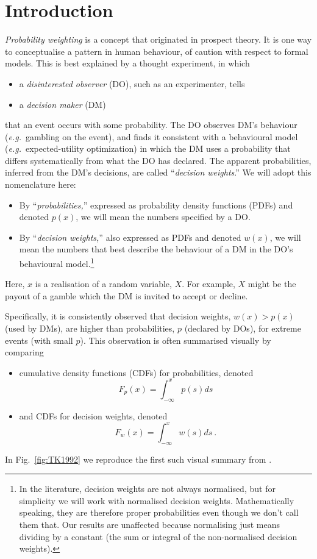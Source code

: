 \documentclass[a4paper, 12pt]{article}
\newcommand{\bi}{\begin{itemize}}
\newcommand{\ei}{\end{itemize}}
\newcommand{\fref}[1]{Fig.~\ref{fig:#1}}
\newcommand{\eg}{{\it e.g.}\ }
\newcommand{\be}{\begin{equation}}
\newcommand{\ee}{\end{equation}}
\begin{document}
\section{Introduction}
{\it Probability weighting} is a concept that originated in prospect theory. It is one way to conceptualise a pattern in human behaviour, of caution with respect to formal models.
This is best explained by a thought experiment, in which  
\bi
	\item a \textit{disinterested observer} (DO), such as an experimenter, tells
	\item a \textit{decision maker} (DM)
\ei
that an event occurs with some probability. The DO observes DM's behaviour (\eg gambling on the event), and finds it consistent with a behavioural model (\eg expected-utility optimization) in which the DM uses a probability that differs systematically from what the DO has declared. The apparent probabilities, inferred from the DM's decisions, are called ``{\it decision weights}.'' We will adopt this nomenclature here: 
% 
\bi
	\item By ``\textit{probabilities,}'' expressed as probability density functions (PDFs) and denoted $p(x)$, we will mean the numbers specified by a DO.
	\item By ``\textit{decision weights,}'' also expressed as PDFs and denoted $w(x)$, we will mean the numbers that best describe the behaviour of a DM in the DO's behavioural model.\footnote{In the literature, decision weights are not always normalised, but for simplicity we will work with normalised decision weights. Mathematically speaking, they are therefore proper probabilities even though we don't call them that. Our results are unaffected because normalising just means dividing by a constant (the sum or integral of the non-normalised decision weights).}
\ei
Here, $x$ is a realisation of a random variable, $X$. For example, $X$ might be the payout of a gamble which the DM is invited to accept or decline.

Specifically, it is consistently observed that decision weights, $w(x)>p(x)$ (used by DMs), are higher than probabilities,  $p$ (declared by DOs), for extreme events (with small $p$). 
This observation is often summarised visually by comparing 
\bi
\item cumulative density functions (CDFs) for probabilities, denoted 
\be
F_p(x)=\int_{-\infty}^x p(s) ds
\ee
\item and CDFs for decision weights, denoted
\be
F_w(x)=\int_{-\infty}^x w(s) ds ~.
\ee
\ei
In \fref{TK1992} we reproduce the first such visual summary from \citet[p.~310]{TverskyKahneman1992}.
\end{document}
